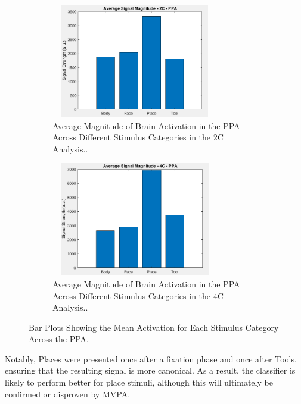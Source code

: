 \begin{figure}[htbp]
 	\centering
	\begin{subfigure}{0.49\textwidth}
		\centering
		\includegraphics[width = 0.8\textwidth, height = 5cm]{assets/images/upa_2C_ppa.png}
		\caption{Average Magnitude of Brain Activation in the \gls{PPA} Across Different Stimulus Categories in the \gls{2C} Analysis..}
		\label{fig:upa_ppa_2C}
	\end{subfigure}
	\hfill
	\begin{subfigure}{0.49\textwidth}
		\centering
	 	\includegraphics[width = 0.8\textwidth, height = 5cm]{assets/images/upa_4C_ppa.png}
		\caption{Average Magnitude of Brain Activation in the \gls{PPA} Across Different Stimulus Categories in the \gls{4C} Analysis..}
		\label{fig:upa_ppa_4C}
	\end{subfigure}
	\caption[Activation Magnitude Per Stimulus Category \textit{(UPA)} Bar Plots for the PPA]{Bar Plots Showing the Mean Activation for Each Stimulus Category Across the \gls{PPA}.}
 	\label{fig:upa_ppa}
\end{figure}

Notably, Places were presented once after a fixation phase and once after Tools, ensuring that the resulting signal is more canonical. As a result, the classifier is likely to perform better for place stimuli, although this will ultimately be confirmed or disproven by \gls{MVPA}.








